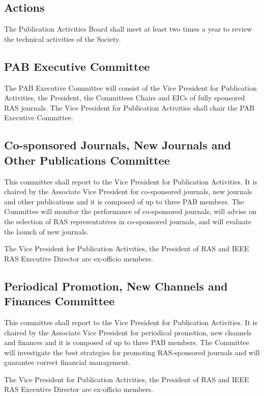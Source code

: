 \documentclass[10pt]{article}
\begin{document}
\subsection{Actions}

The Publication Activities Board shall meet at least two times a year to review the technical activities of the Society.

\subsection{PAB Executive Committee}
\label{PAB:ExCom}

The PAB Executive Committee will consist of the Vice President for Publication Activities, the President, the Committees Chairs and EICs of fully sponsored RAS journals. The Vice President for Publication Activities shall chair the PAB Executive Committee.


\subsection{Co-sponsored Journals, New Journals and Other Publications Committee}

This committee shall report to the Vice President for Publication Activities. It is chaired by the Associate Vice President for co-sponsored journals, new journals and other publications and it is composed of up to three PAB members. The Committee will monitor the performance of co-sponsored journals, will advise on the selection of RAS representatives in co-sponsored journals, and will evaluate the launch of new journals. 

The Vice President for Publication Activities, the President of RAS and IEEE RAS Executive Director are ex-officio members.


\subsection{Periodical Promotion, New Channels and Finances Committee}

This committee shall report to the Vice President for Publication Activities. It is chaired by the Associate Vice President for periodical promotion, new channels and finances and it is composed of up to three PAB members. The Committee will investigate the best strategies for promoting RAS-sponsored journals and will guarantee correct financial management.

The Vice President for Publication Activities, the President of RAS and IEEE RAS Executive Director are ex-officio members.
\end{document}
